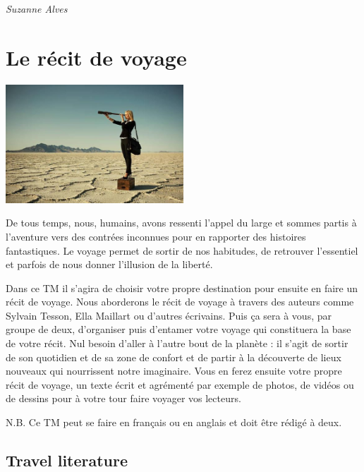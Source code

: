 \documentclass[
  10pt,
  french,
  a5paper,
  openany]{book}
\newenvironment{signature}{\begin{flushright}}{\end{flushright}}
\begin{document}
\begin{signature}
\emph{Suzanne Alves}

\end{signature}

\hypertarget{le-ruxe9cit-de-voyage}{%
\chapter{Le récit de voyage}\label{le-ruxe9cit-de-voyage}}

\begin{center}
\includegraphics[width=\textwidth,height=12em]{images/le-recit-de-voyage.jpg}

\end{center}

De tous temps, nous, humains, avons ressenti l'appel du large et sommes partis à l'aventure vers des contrées inconnues pour en rapporter des histoires fantastiques. Le voyage permet de sortir de nos habitudes, de retrouver l'essentiel et parfois de nous donner l'illusion de la liberté.

Dans ce TM il s'agira de choisir votre propre destination pour ensuite en faire un récit de voyage. Nous aborderons le récit de voyage à travers des auteurs comme Sylvain Tesson, Ella Maillart ou d'autres écrivains. Puis ça sera à vous, par groupe de deux, d'organiser puis d'entamer votre voyage qui constituera la base de votre récit. Nul besoin d'aller à l'autre bout de la planète : il s'agit de sortir de son quotidien et de sa zone de confort et de partir à la découverte de lieux nouveaux qui nourrissent notre imaginaire. Vous en ferez ensuite votre propre récit de voyage, un texte écrit et agrémenté par exemple de photos, de vidéos ou de dessins pour à votre tour faire voyager vos lecteurs.

N.B. Ce TM peut se faire en français ou en anglais et doit être rédigé à deux.

\hypertarget{travel-literature}{%
\section*{Travel literature}\label{travel-literature}}
\end{document}
